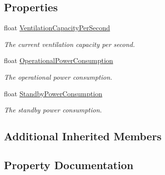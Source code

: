 \subsection*{Properties}
\begin{DoxyCompactItemize}
\item 
float \hyperlink{class_s_e_mod_a_p_i_1_1_a_p_i_1_1_definitions_1_1_cube_blocks_1_1_air_vent_definition_a588e207b1fa8f45d7e634bdc4e8a3cfb}{Ventilation\+Capacity\+Per\+Second}
\begin{DoxyCompactList}\small\item\em The current ventilation capacity per second. \end{DoxyCompactList}\item 
float \hyperlink{class_s_e_mod_a_p_i_1_1_a_p_i_1_1_definitions_1_1_cube_blocks_1_1_air_vent_definition_a92bc8f26126ea66e3af8471e5e65b98c}{Operational\+Power\+Consumption}
\begin{DoxyCompactList}\small\item\em The operational power consumption. \end{DoxyCompactList}\item 
float \hyperlink{class_s_e_mod_a_p_i_1_1_a_p_i_1_1_definitions_1_1_cube_blocks_1_1_air_vent_definition_a941664a55d865c6c337ad95fefb90919}{Standby\+Power\+Consumption}
\begin{DoxyCompactList}\small\item\em The standby power consumption. \end{DoxyCompactList}\end{DoxyCompactItemize}
\subsection*{Additional Inherited Members}


\subsection{Property Documentation}
\hypertarget{class_s_e_mod_a_p_i_1_1_a_p_i_1_1_definitions_1_1_cube_blocks_1_1_air_vent_definition_a92bc8f26126ea66e3af8471e5e65b98c}{}
